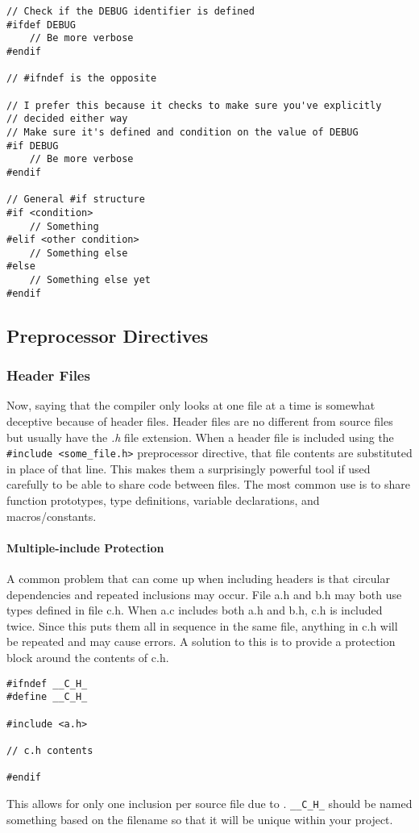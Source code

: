 \documentclass[10pt]{article}
\begin{document}
\begin{lstlisting}[label=lst-conditional-compilation,caption=Conditional compilation]
// Check if the DEBUG identifier is defined
#ifdef DEBUG
	// Be more verbose
#endif

// #ifndef is the opposite

// I prefer this because it checks to make sure you've explicitly
// decided either way
// Make sure it's defined and condition on the value of DEBUG
#if DEBUG
	// Be more verbose
#endif

// General #if structure
#if <condition>
	// Something
#elif <other condition>
	// Something else
#else
	// Something else yet
#endif
\end{lstlisting}



\subsection{Preprocessor Directives}

\subsubsection{Header Files}
Now, saying that the compiler only looks at one file at a time is somewhat deceptive because of header files. Header files are no different from source files but usually have the \textit{.h} file extension. When a header file is included using the \texttt{\#include <some\_file.h>} preprocessor directive, that file contents are substituted in place of that line. This makes them a surprisingly powerful tool if used carefully to be able to share code between files. The most common use is to share function prototypes, type definitions, variable declarations, and macros/constants.

\paragraph{Multiple-include Protection}
A common problem that can come up when including headers is that circular dependencies and repeated inclusions may occur. File a.h and b.h may both use types defined in file c.h. When a.c includes both a.h and b.h, c.h is included twice. Since this puts them all in sequence in the same file, anything in c.h will be repeated and may cause errors. A solution to this is to provide a protection block around the contents of c.h.
\begin{lstlisting}[label=lst-include-protection,caption=Header include protection (c.h)]
#ifndef __C_H_
#define __C_H_

#include <a.h>

// c.h contents

#endif

\end{lstlisting}
This allows for only one inclusion per source file due to . \texttt{\_\_C\_H\_} should be named something based on the filename so that it will be unique within your project.
\end{document}
